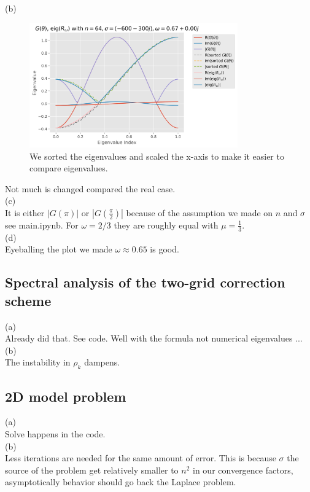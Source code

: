 \documentclass[a4paper,12pt]{article}
\begin{document}
(b) \\
\begin{figure}[h!]
    \centering
    \includegraphics[width=0.8\textwidth]{../code/plts/eigenvalues_1DcomplexG.png}
    \caption{We sorted the eigenvalues and scaled the x-axis to make it easier to compare eigenvalues.}
    \label{fig:eigen complex G 1D}
\end{figure}
Not much is changed compared the real case. \\
(c) \\
It is either $|G(\pi)|$ or $|G(\frac{\pi}{2})|$ because of the assumption we made on $n$ and $\sigma$
see main.ipynb. For $\omega = 2/3$ they are roughly equal with $\mu = \frac{1}{3}$.\\
(d) \\
Eyeballing the plot we made $\omega \approx 0.65$ is good.

\subsection{Spectral analysis of the two-grid correction scheme}
(a) \\
Already did that. See code. Well with the formula not numerical eigenvalues ... \\
(b) \\
The instability in $\rho_{k}$ dampens.


\subsection{2D model problem}
(a) \\
Solve happens in the code.\\
(b) \\
Less iterations are needed for the same amount of error. This is because
$\sigma$ the source of the problem get relatively smaller to $n^{2}$ in
our convergence factors, asymptotically behavior should go back the
Laplace problem.
\end{document}
